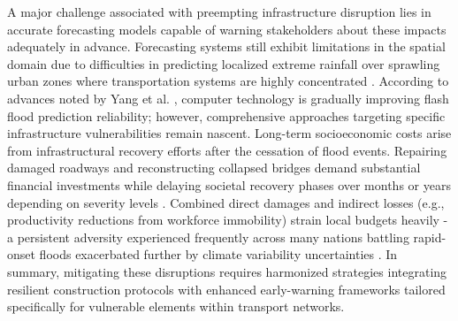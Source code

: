 A major challenge associated with preempting infrastructure disruption lies in accurate forecasting models capable of warning stakeholders about these impacts adequately in advance. Forecasting systems still exhibit limitations in the spatial domain due to difficulties in predicting localized extreme rainfall over sprawling urban zones where transportation systems are highly concentrated \citep{Ritter2021a}\citep{AlRawas2024}\citep{Lowrie2022}. According to advances noted by Yang et al. \citep{Yang2022}, computer technology is gradually improving flash flood prediction reliability; however, comprehensive approaches targeting specific infrastructure vulnerabilities remain nascent.
Long-term socioeconomic costs arise from infrastructural recovery efforts after the cessation of flood events. Repairing damaged roadways and reconstructing collapsed bridges demand substantial financial investments while delaying societal recovery phases over months or years depending on severity levels \citep{Abegaz2024}\citep{Saad2024}. Combined direct damages and indirect losses (e.g., productivity reductions from workforce immobility) strain local budgets heavily - a persistent adversity experienced frequently across many nations battling rapid-onset floods exacerbated further by climate variability uncertainties \citep{Ritter2021a}\citep{Saad2024}.
In summary, mitigating these disruptions requires harmonized strategies integrating resilient construction protocols with enhanced early-warning frameworks tailored specifically for vulnerable elements within transport networks.
